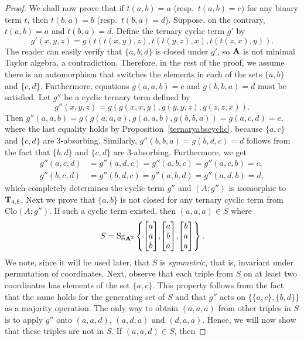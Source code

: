 \documentclass[11pt]{amsart}
\newcommand{\m}[1]{\mathbf{\uppercase{#1}}}
\theoremstyle{definition}
\theoremstyle{remark}
\theoremstyle{plain}
\begin{document}
\begin{proof}
We shall now prove that if $t(a,b)=a$ (resp.~$t(a,b)=c$) for any binary term $t$, then $t(b,a)=b$ (resp.~$t(b,a)=d$). Suppose, on the contrary, $t(a,b)=a$ and $t(b,a)=d$. Define the ternary cyclic term $g'$ by $$g'(x,y,z)=g(t(t(x,y),z),t(t(y,z),x),t(t(z,x),y)).$$ The reader can easily verify that $\{a,b,d\}$ is closed under $g'$, so $\m a$ is not minimal Taylor algebra, a contradiction. Therefore, in the rest of the proof, we assume there is an automorphism that switches the elements in each of the sets $\{a,b\}$ and $\{c,d\}$. Furthermore, equations $g(a,a,b)=c$ and $g(b,b,a)=d$ must be satisfied. Let $g''$ be a cyclic ternary term defined by $$g''(x,y,z)=g(g(x,x,y),g(y,y,z),g(z,z,x)).$$ Then $g''(a,a,b)=g(g(a,a,a),g(a,a,b),g(b,b,a))=g(a,c,d)=c$, where the last equality holds by Proposition~\ref{ternaryabscyclic}, because $\{a,c\}$ and $\{c,d\}$ are 3-absorbing. Similarly, $g''(b,b,a)=g(b,d,c)=d$ follows from the fact that $\{b,d\}$ and $\{c,d\}$ are 3-absorbing. Furthermore, we get
\begin{align*}
    g''(a,c,d)&=g''(a,d,c)=g''(a,b,c)=g''(a,c,b)=c,\\
    g''(b,c,d)&=g''(b,d,c)=g''(a,b,d)=g''(a,d,b)=d,
\end{align*}
which completely determines the cyclic term $g''$ and $(A;g'')$ is isomorphic to $\m t_{4,8}$.
Next we prove that $\{a,b\}$ is not closed for any ternary cyclic term from $\mathrm{Clo}(A;g'')$. If such a cyclic term existed, then $(a,a,a)\in S$ where 
\[
S=\mathrm{Sg}_{\m a^3}\left\{
\begin{bmatrix}
a \\
a \\
b
\end{bmatrix}\!,\!
\begin{bmatrix}
a \\
b \\
a
\end{bmatrix}\!,\!
\begin{bmatrix}
b \\
a \\
a
\end{bmatrix}
\right\}.
\]
We note, since it will be used later, that $S$ is \emph{symmetric}, that is, invariant under permutation of coordinates. Next, observe that each triple from $S$ on at least two coordinates has elements of the set $\{a,c\}$. This property follows from the fact that the same holds for the generating set of $S$ and that $g''$ acts on $\{\{a,c\},\{b,d\}\}$ as a majority operation. The only way to obtain $(a,a,a)$ from other triples in $S$ is to apply $g''$ onto $(a,a,d)$, $(a,d,a)$ and $(d,a,a)$. Hence, we will now show that these triples are not in $S$. If $(a,a,d)\in S$, then 

\end{proof}
\end{document}
